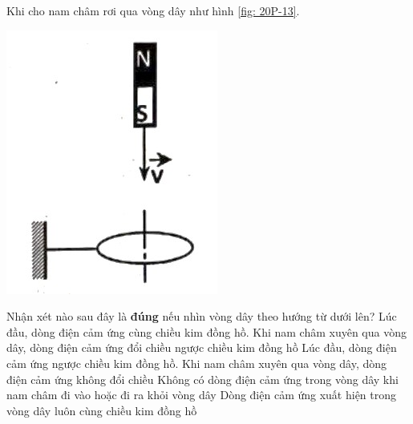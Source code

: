\begin{ex}
	Khi cho nam châm rơi qua vòng dây như hình \ref{fig: 20P-13}.
	\begin{center}
		\includegraphics[width=0.2\linewidth]{figs/VN12-Y24-PH-SYL-020P-13}
		\label{fig: 20P-13}
	\end{center}
	Nhận xét nào sau đây là \textbf{đúng} nếu nhìn vòng dây theo hướng từ dưới lên?
	\choice
	{\True Lúc đầu, dòng điện cảm ứng cùng chiều kim đồng hồ. Khi nam châm xuyên qua vòng dây, dòng điện cảm ứng đổi chiều ngược chiều kim đồng hồ}
	{Lúc đầu, dòng điện cảm ứng ngược chiều kim đồng hồ. Khi nam châm xuyên qua vòng dây, dòng điện cảm ứng không đổi chiều}
	{Không có dòng điện cảm ứng trong vòng dây khi nam châm đi vào hoặc đi ra khỏi vòng dây}
	{Dòng điện cảm ứng xuất hiện trong vòng dây luôn cùng chiều kim đồng hồ}
	\loigiai{}
\end{ex}

